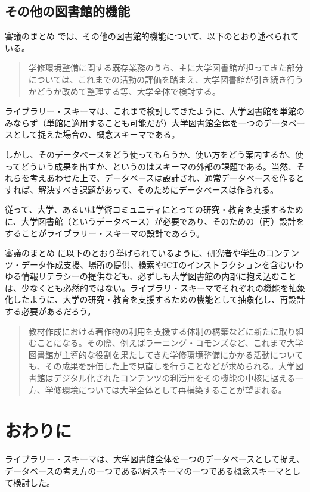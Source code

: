 \documentclass[submit,noauthor]{ono}
\begin{document}
\subsection{その他の図書館的機能}

審議のまとめ \cite{まとめ} では、その他の図書館的機能について、以下のとおり述べられている。

\begin{quote}
学修環境整備に関する既存業務のうち、主に大学図書館が担ってきた部分については、これまでの活動の評価を踏まえ、大学図書館が引き続き行うかどうか改めて整理する等、大学全体で検討する。
\end{quote}

ライブラリー・スキーマは、これまで検討してきたように、大学図書館を単館のみならず（単館に適用することも可能だが）大学図書館全体を一つのデータベースとして捉えた場合の、概念スキーマである。

しかし、そのデータベースをどう使ってもらうか、使い方をどう案内するか、使ってどういう成果を出すか、というのはスキーマの外部の課題である。当然、それらを考えあわせた上で、データベースは設計され、通常データベースを作るとすれば、解決すべき課題があって、そのためにデータベースは作られる。

従って、大学、あるいは学術コミュニティにとっての研究・教育を支援するために、大学図書館（というデータベース）が必要であり、そのための（再）設計をすることがライブラリー・スキーマの設計であろう。

審議のまとめ\cite{まとめ} に以下のとおり挙げられているように、研究者や学生のコンテンツ・データ作成支援、場所の提供、検索やICTのインストラクションを含むいわゆる情報リテラシーの提供なども、必ずしも大学図書館の内部に抱え込むことは、少なくとも必然的ではない。ライブラリ・スキーマでそれぞれの機能を抽象化したように、大学の研究・教育を支援するための機能として抽象化し、再設計する必要があるだろう。

\begin{quotation}
教材作成における著作物の利用を支援する体制の構築などに新たに取り組むことになる。その際、例えばラーニング・コモンズなど、これまで大学図書館が主導的な役割を果たしてきた学修環境整備にかかる活動についても、その成果を評価した上で見直しを行うことなどが求められる。大学図書館はデジタル化されたコンテンツの利活用をその機能の中核に据える一方、学修環境については大学全体として再構築することが望まれる。
\end{quotation}

\section{おわりに}
ライブラリー・スキーマは、大学図書館全体を一つのデータベースとして捉え、データベースの考え方の一つである3層スキーマの一つである概念スキーマとして検討した。
\end{document}

